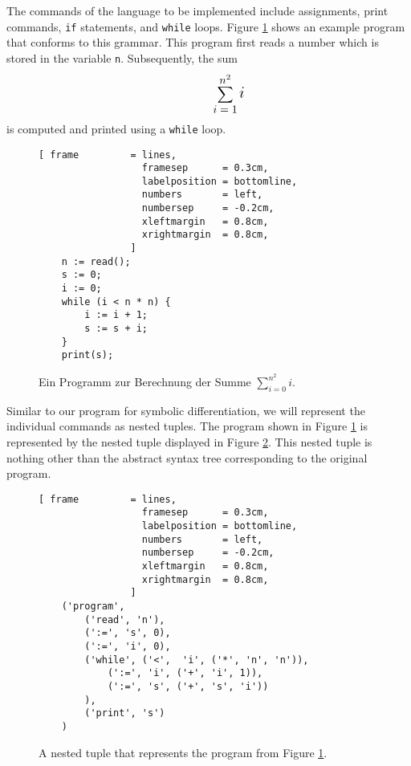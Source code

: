 The commands of the language to be implemented include assignments, print commands,
\texttt{if} statements, and \texttt{while} loops. Figure \ref{fig:sum.sl} shows
an example program that conforms to this grammar. This program first reads a number
which is stored in the variable \texttt{n}. Subsequently, the sum
\[
\hspace*{1.3cm}
\displaystyle\sum\limits_{\mbox{$\normalsize i=1$}}^{\mbox{$\normalsize n^2$}} \mbox{\Large $i$}
\]
is computed and printed using a \texttt{while} loop.

\begin{figure}[!ht]
\centering
\begin{Verbatim}[ frame         = lines, 
                  framesep      = 0.3cm, 
                  labelposition = bottomline,
                  numbers       = left,
                  numbersep     = -0.2cm,
                  xleftmargin   = 0.8cm,
                  xrightmargin  = 0.8cm,
                ]
    n := read();
    s := 0;
    i := 0;
    while (i < n * n) {
        i := i + 1;
        s := s + i;
    }
    print(s);
\end{Verbatim}
\vspace*{-0.3cm}
\caption{Ein Programm zur Berechnung der Summe $\sum\limits_{i=0}^{n^2} i$.}
\label{fig:sum.sl}
\end{figure}
\FloatBarrier

Similar to our program for symbolic differentiation, we will represent the individual commands as
nested tuples. The program shown in Figure \ref{fig:sum.sl} is represented by the nested tuple displayed in
Figure \ref{fig:sum.ast}. This nested tuple is nothing other than the abstract syntax tree
corresponding to the original program. 

\begin{figure}[!ht]
\centering
\begin{Verbatim}[ frame         = lines, 
                  framesep      = 0.3cm, 
                  labelposition = bottomline,
                  numbers       = left,
                  numbersep     = -0.2cm,
                  xleftmargin   = 0.8cm,
                  xrightmargin  = 0.8cm,
                ]
    ('program',
        ('read', 'n'),
        (':=', 's', 0),
        (':=', 'i', 0),
        ('while', ('<',  'i', ('*', 'n', 'n')),
            (':=', 'i', ('+', 'i', 1)),
            (':=', 's', ('+', 's', 'i'))
        ),
        ('print', 's')
    )
\end{Verbatim}
\vspace*{-0.3cm}
\caption{A nested tuple that represents the program from Figure \ref{fig:sum.sl}.}
\label{fig:sum.ast}
\end{figure}

